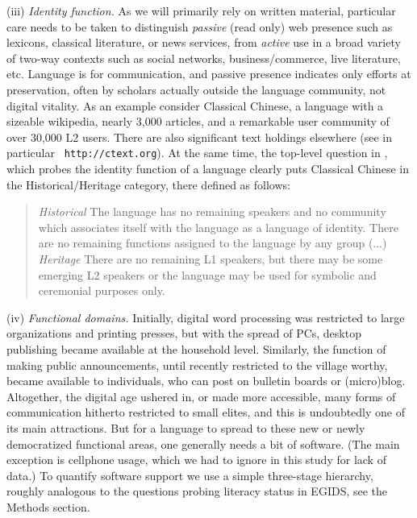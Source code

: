 \documentclass[10pt]{article}
\begin{document}
\bigskip
(iii) {\it Identity function.} As we will primarily rely on written material,
particular care needs to be taken to distinguish {\it passive} (read only) web
presence such as lexicons, classical literature, or news services, from {\it
  active} use in a broad variety of two-way contexts such as social networks,
business/commerce, live literature, etc. Language is for communication, and
passive presence indicates only efforts at preservation, often by scholars
actually outside the language community, not digital vitality. As an example
consider Classical Chinese, a language with a sizeable wikipedia, nearly 3,000
articles, and a remarkable user community of over 30,000 L2 users. There are
also significant text holdings elsewhere (see in particular {\tt
  http://ctext.org}). At the same time, the top-level question in
\cite{Lewis:2010}, which probes the identity function of a language clearly
puts Classical Chinese in the Historical/Heritage category, {\color{black} there defined as 
follows}: 

\medskip
\begin{quote}
{\it Historical} The language has no remaining speakers and no community which
associates itself with the language as a language of identity. There are no
remaining functions assigned to the language by any group (...)\\
{\it Heritage} There are
no remaining L1 speakers, but there may be some emerging L2 speakers or the
language may be used for symbolic and ceremonial purposes only. 
\end{quote}




\bigskip

(iv) {\it Functional domains.} Initially, digital word processing was restricted to
large organizations and printing presses, but with the spread of PCs, desktop
publishing became available at the household level. Similarly, the function of
making public announcements, until recently restricted to the village worthy,
became available to individuals, who can post on bulletin boards or
(micro)blog. Altogether, the digital age ushered in, or made more accessible,
many forms of communication hitherto restricted to small elites, and this is
undoubtedly one of its main attractions. But for a language to spread to these
new or newly democratized functional areas, one generally needs a bit of
software. (The main exception is cellphone usage, which we had to ignore in
this study for lack of data.) To quantify software support we use a simple
three-stage hierarchy, roughly analogous to the questions probing literacy 
status in EGIDS{\color{black}, see the Methods section}.
\end{document}
